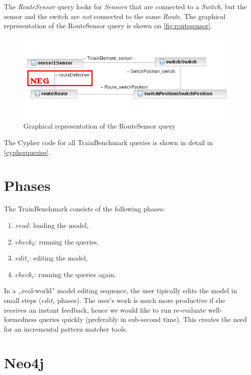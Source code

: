 The \textit{RouteSensor} query looks for \textit{Sensors} that are connected to a \textit{Switch}, but the sensor and the switch are \textit{not} connected to the same \textit{Route}. The graphical representation of the RouteSensor query is shown on \autoref{fig:routesensor}.

\begin{figure}
\begin{center}
\includegraphics[]{figures/OD_RouteSensor}
\caption{Graphical representation of the RouteSensor query}
\label{fig:routesensor}
\end{center}
\end{figure}

The Cypher code for all TrainBenchmark queries is shown in detail in \autoref{cypherqueries}.

\section{Phases}

The TrainBenchmark consists of the following phases:

\begin{enumerate}
  \item $read$: loading the model,
  \item $check_0$: running the queries,
  \item $edit_i$: editing the model, 
  \item $check_i$: running the queries again.
\end{enumerate}

In a ,,real-world'' model editing sequence, the user tipically edits the model in small steps ($edit_i$ phases). The user's work is much more productive if she receives an instant feedback, hence we would like to run re-evaluate well-formedness queries quickly (preferably in sub-second time). This creates the need for an incremental pattern matcher tools.

\section{Neo4j}


